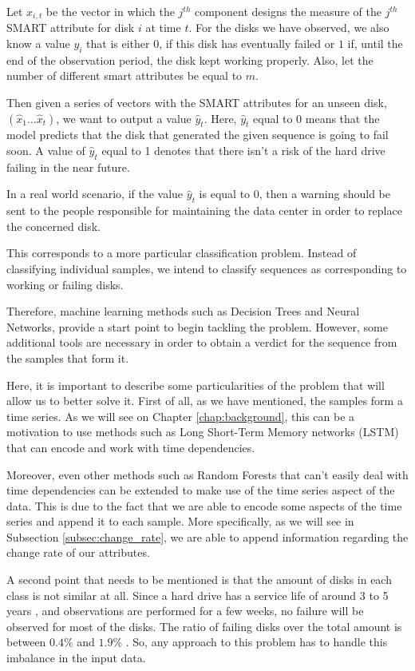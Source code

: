 Let $x_{i,t}$ be the vector in which the $j^{th}$ component designs the measure of the $j^{th}$ SMART attribute for disk $i$ at time $t$.
For the disks we have observed, we also know a value $y_i$ that is either $0$, if this disk has eventually failed or $1$ if, until the end of the observation period, the disk kept working properly.
Also, let the number of different smart attributes be equal to $m$.

Then given a series of vectors with the SMART attributes for an unseen disk, $\left(\hat{x}_1\dots\hat{x}_t\right)$, we want to output a value $\hat{y}_t$.
Here, $\hat{y}_t$ equal to 0 means that the model predicts that the disk that generated the given sequence is going to fail soon.
A value of $\hat{y}_t$ equal to 1 denotes that there isn't a risk of the hard drive failing in the near future.

In a real world scenario, if the value $\hat{y}_t$ is equal to $0$, then a warning should be sent to the people responsible for maintaining the data center in order to replace the concerned disk.

This corresponds to a more particular classification problem.
Instead of classifying individual samples, we intend to classify sequences as corresponding to working or failing disks.

Therefore, machine learning methods such as Decision Trees and Neural Networks, provide a start point to begin tackling the problem.
However, some additional tools are necessary in order to obtain a verdict for the sequence from the samples that form it.

Here, it is important to describe some particularities of the problem that will allow us to better solve it.
First of all, as we have mentioned, the samples form a time series.
As we will see on Chapter \ref{chap:background}, this can be a motivation to use methods such as Long Short-Term Memory networks (LSTM) that can encode and work with time dependencies.

Moreover, even other methods such as Random Forests that can't easily deal with time dependencies can be extended to make use of the time series aspect of the data.
This is due to the fact that we are able to encode some aspects of the time series and append it to each sample.
More specifically, as we will see in Subsection \ref{subsec:change_rate}, we are able to append information regarding the change rate of our attributes.

A second point that needs to be mentioned is that the amount of disks in each class is not similar at all.
Since a hard drive has a service life of around 3 to 5 years \cite{Vishwanath10}, and observations are performed for a few weeks, no failure will be observed for most of the disks.
The ratio of failing disks over the total amount is between $0.4\%$ and $1.9\%$ \cite{Xu16}.
So, any approach to this problem has to handle this imbalance in the input data.

